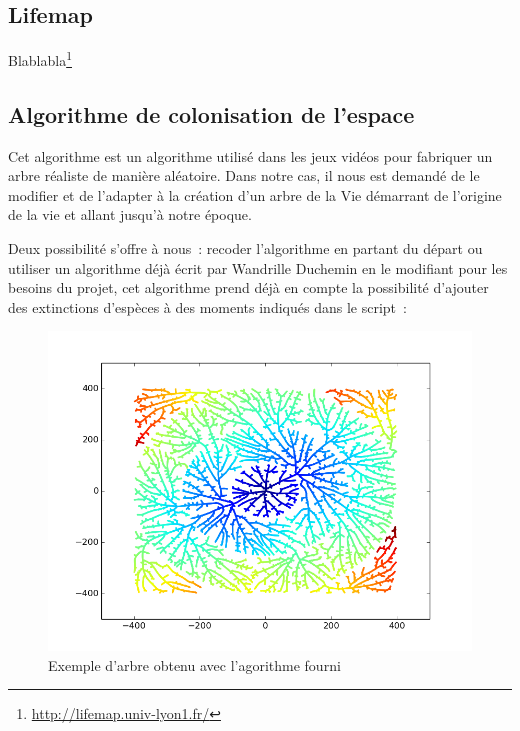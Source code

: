 \documentclass[a4paper]{article}
\begin{document}
	\subsection{Lifemap}
		Blablabla\footnote{\url{http://lifemap.univ-lyon1.fr/}}

	\subsection{Algorithme de colonisation de l'espace}
		Cet algorithme est un algorithme utilisé dans les jeux vidéos pour fabriquer un arbre réaliste de manière aléatoire. Dans notre cas, il nous est demandé de le modifier et de l’adapter à la création d’un arbre de la Vie démarrant  de l’origine de la vie et allant jusqu’à notre époque.
	
		Deux possibilité s’offre à nous :  recoder l’algorithme en partant du départ ou utiliser un algorithme déjà écrit par Wandrille Duchemin en le modifiant pour les besoins du projet, cet algorithme prend déjà en compte la possibilité d’ajouter des extinctions d’espèces à des moments indiqués dans le script :
		\begin{figure}[!h]
			\centering
			\includegraphics[width=12cm]{multipleExtinction.png}
			\caption{Exemple d'arbre obtenu avec l'agorithme fourni}
		\end{figure}
	
\end{document}
